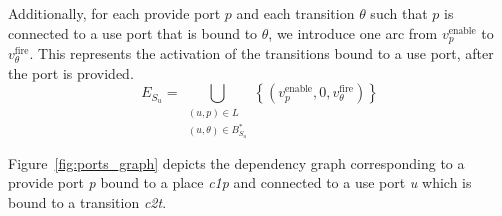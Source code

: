 Additionally, for each provide port $p$ and each transition
$\theta$ such that $p$ is connected to a use port that is bound
to $\theta$, we introduce one arc from $v_p^\text{enable}$ to
$v_\theta^\text{fire}$. This represents the activation of the transitions
bound to a use port, after the port is provided.
\[
E_{S_u} = \bigcup_{\substack{(u,p)\in L \\ (u,\theta)\in B_{S_u}^*}} \left\{ \left(v_p^\text{enable},0,v_\theta^\text{fire}\right)\right\}
\]

Figure~\ref{fig:ports_graph} depicts the dependency graph corresponding to a
provide port \emph{p} bound to a place \emph{c1p} and connected to
a use port \emph{u} which is bound to a transition \emph{c2t}.





